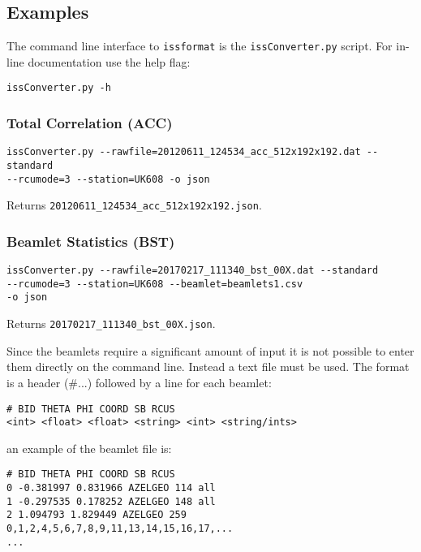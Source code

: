 \documentclass[10pt,a4paper]{article}
\begin{document}
\subsection{Examples}

The command line interface to \texttt{issformat} is the \texttt{issConverter.py}
script. For in-line documentation use the help flag:

\begin{verbatim}
issConverter.py -h
\end{verbatim}

\subsubsection{Total Correlation (ACC)}

\begin{verbatim}
issConverter.py --rawfile=20120611_124534_acc_512x192x192.dat --standard
--rcumode=3 --station=UK608 -o json
\end{verbatim}

\noindent Returns \texttt{20120611\_124534\_acc\_512x192x192.json}.

\subsubsection{Beamlet Statistics (BST)}

\begin{verbatim}
issConverter.py --rawfile=20170217_111340_bst_00X.dat --standard
--rcumode=3 --station=UK608 --beamlet=beamlets1.csv
-o json
\end{verbatim}

\noindent Returns \texttt{20170217\_111340\_bst\_00X.json}.

Since the beamlets require a significant amount of input it is not possible to
enter them directly on the command line. Instead a text file must be used. The
format is a header (\#...) followed by a line for each beamlet:

\begin{verbatim}
# BID THETA PHI COORD SB RCUS
<int> <float> <float> <string> <int> <string/ints>
\end{verbatim}

\noindent an example of the beamlet file is:

\begin{verbatim}
# BID THETA PHI COORD SB RCUS
0 -0.381997 0.831966 AZELGEO 114 all
1 -0.297535 0.178252 AZELGEO 148 all
2 1.094793 1.829449 AZELGEO 259 0,1,2,4,5,6,7,8,9,11,13,14,15,16,17,...
...
\end{verbatim}
\end{document}

